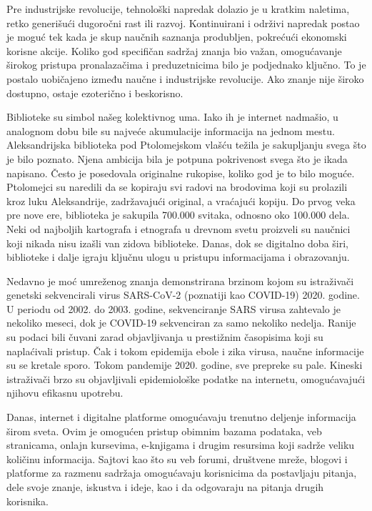 \documentclass{article}
\begin{document}
Pre industrijske revolucije, tehnološki napredak dolazio je u kratkim naletima, retko generišući dugoročni rast ili razvoj. Kontinuirani i održivi napredak postao je moguć tek kada je skup naučnih saznanja produbljen, pokrećući ekonomski korisne akcije. Koliko god specifičan sadržaj znanja bio važan, omogućavanje širokog pristupa pronalazačima i preduzetnicima bilo je podjednako ključno. To je postalo uobičajeno između naučne i industrijske revolucije. Ako znanje nije široko dostupno, ostaje ezoterično i beskorisno.

Biblioteke su simbol našeg kolektivnog uma. Iako ih je internet nadmašio, u analognom dobu bile su najveće akumulacije informacija na jednom mestu. Aleksandrijska biblioteka pod Ptolomejskom vlašću težila je sakupljanju svega što je bilo poznato. Njena ambicija bila je potpuna pokrivenost svega što je ikada napisano. Često je posedovala originalne rukopise, koliko god je to bilo moguće. Ptolomejci su naredili da se kopiraju svi radovi na brodovima koji su prolazili kroz luku Aleksandrije, zadržavajući original, a vraćajući kopiju. Do prvog veka pre nove ere, biblioteka je sakupila 700.000 svitaka, odnosno oko 100.000 dela. Neki od najboljih kartografa i etnografa u drevnom svetu proizveli su naučnici koji nikada nisu izašli van zidova biblioteke. Danas, dok se digitalno doba širi, biblioteke i dalje igraju ključnu ulogu u pristupu informacijama i obrazovanju.

Nedavno je moć umreženog znanja demonstrirana brzinom kojom su istraživači genetski sekvencirali virus SARS-CoV-2 (poznatiji kao COVID-19) 2020. godine. U periodu od 2002. do 2003. godine, sekvenciranje SARS virusa zahtevalo je nekoliko meseci, dok je COVID-19 sekvenciran za samo nekoliko nedelja. Ranije su podaci bili čuvani zarad objavljivanja u prestižnim časopisima koji su naplaćivali pristup. Čak i tokom epidemija ebole i zika virusa, naučne informacije su se kretale sporo. Tokom pandemije 2020. godine, sve prepreke su pale. Kineski istraživači brzo su objavljivali epidemiološke podatke na internetu, omogućavajući njihovu efikasnu upotrebu.

Danas, internet i digitalne platforme omogućavaju trenutno deljenje informacija širom sveta. Ovim je omogućen pristup obimnim bazama podataka, veb stranicama, onlajn kursevima, e-knjigama i drugim resursima koji sadrže veliku količinu informacija. Sajtovi kao što su veb forumi, društvene mreže, blogovi i platforme za razmenu sadržaja omogućavaju korisnicima da postavljaju pitanja, dele svoje znanje, iskustva i ideje, kao i da odgovaraju na pitanja drugih korisnika.
\end{document}
